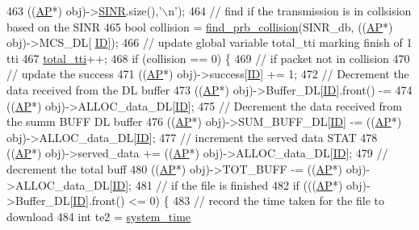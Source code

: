 \begin{DoxyCode}
463         ((\hyperlink{classAP}{AP}*) obj)->\hyperlink{classSTA_a8d180b4c6fda9f084bea3d396e66532c}{SINR}.size(),\textcolor{charliteral}{'\(\backslash\)n'});
464         \textcolor{comment}{// find if the transmission is in collsision based on the SINR}
465         \textcolor{keywordtype}{bool} collision = \hyperlink{common_8cpp_a460309c5cf44425cb0495854d0d80967}{find\_prb\_collision}(SINR\_db, ((\hyperlink{classAP}{AP}*) obj)->MCS\_DL[
      \hyperlink{classSTA_a9376abb50969b5b16aeb5fb0e449e6f7}{ID}]);
466         \textcolor{comment}{// update global variable total\_tti marking finish of 1 tti}
467         \hyperlink{STA_8cpp_a7e2c5000806892db20041b55ceb34dbf}{total\_tti}++;
468         \textcolor{keywordflow}{if} (collision == 0) \{
469             \textcolor{comment}{// if packet not in collision}
470             \textcolor{comment}{// update the success }
471             ((\hyperlink{classAP}{AP}*) obj)->success[\hyperlink{classSTA_a9376abb50969b5b16aeb5fb0e449e6f7}{ID}] += 1;
472             \textcolor{comment}{// Decrement the data received from the DL buffer}
473             ((\hyperlink{classAP}{AP}*) obj)->Buffer\_DL[\hyperlink{classSTA_a9376abb50969b5b16aeb5fb0e449e6f7}{ID}].front() -=
474                     ((\hyperlink{classAP}{AP}*) obj)->ALLOC\_data\_DL[\hyperlink{classSTA_a9376abb50969b5b16aeb5fb0e449e6f7}{ID}];
475             \textcolor{comment}{// Decrement the data received from the summ BUFF DL buffer}
476             ((\hyperlink{classAP}{AP}*) obj)->SUM\_BUFF\_DL[\hyperlink{classSTA_a9376abb50969b5b16aeb5fb0e449e6f7}{ID}] -= ((\hyperlink{classAP}{AP}*) obj)->ALLOC\_data\_DL[\hyperlink{classSTA_a9376abb50969b5b16aeb5fb0e449e6f7}{ID}];
477             \textcolor{comment}{// increment the served data STAT}
478             ((\hyperlink{classAP}{AP}*) obj)->served\_data += ((\hyperlink{classAP}{AP}*) obj)->ALLOC\_data\_DL[\hyperlink{classSTA_a9376abb50969b5b16aeb5fb0e449e6f7}{ID}];
479             \textcolor{comment}{// decrement the total buff}
480             ((\hyperlink{classAP}{AP}*) obj)->TOT\_BUFF -= ((\hyperlink{classAP}{AP}*) obj)->ALLOC\_data\_DL[\hyperlink{classSTA_a9376abb50969b5b16aeb5fb0e449e6f7}{ID}];
481             \textcolor{comment}{// if the file is finished}
482             \textcolor{keywordflow}{if} (((\hyperlink{classAP}{AP}*) obj)->Buffer\_DL[\hyperlink{classSTA_a9376abb50969b5b16aeb5fb0e449e6f7}{ID}].front() <= 0) \{
483                 \textcolor{comment}{// record the time taken for the file to download}
484                 \textcolor{keywordtype}{int} te2 = \hyperlink{STA_8cpp_aaa03a568dc1d9d3391286ea24b9cfb63}{system\_time}

\end{DoxyCode}
